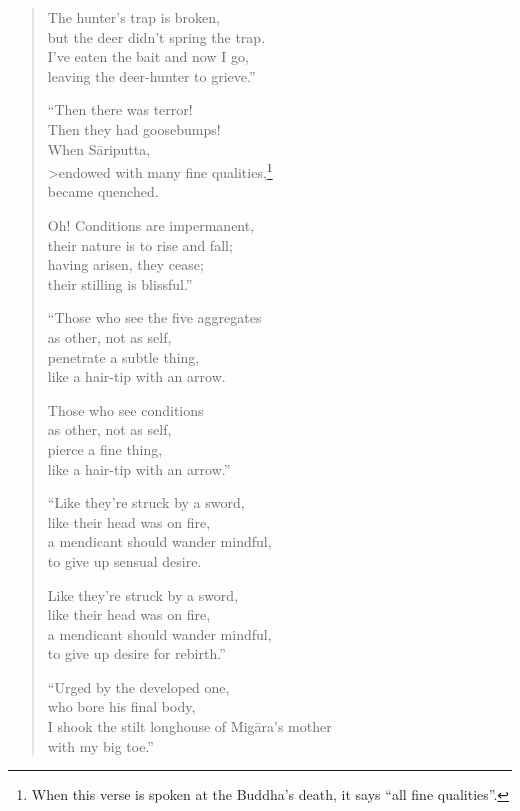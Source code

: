 \documentclass[12pt,openany]{book}%
\begin{document}
\begin{verse}
The hunter’s trap is broken, \\
but the deer didn’t spring the trap. \\
I’ve eaten the bait and now I go, \\
leaving the deer-hunter to grieve.” 

“Then there was terror! \\
Then they had goosebumps! \\
When \textsanskrit{Sāriputta}, \\>endowed with many fine qualities,\footnote{When this verse is spoken at the Buddha’s death, it says “all fine qualities”. } \\
became quenched. 

Oh! Conditions are impermanent, \\
their nature is to rise and fall; \\
having arisen, they cease; \\
their stilling is blissful.” 

“Those who see the five aggregates \\
as other, not as self, \\
penetrate a subtle thing, \\
like a hair-tip with an arrow. 

Those who see conditions \\
as other, not as self, \\
pierce a fine thing, \\
like a hair-tip with an arrow.” 

“Like they’re struck by a sword, \\
like their head was on fire, \\
a mendicant should wander mindful, \\
to give up sensual desire. 

Like they’re struck by a sword, \\
like their head was on fire, \\
a mendicant should wander mindful, \\
to give up desire for rebirth.” 

“Urged by the developed one, \\
who bore his final body, \\
I shook the stilt longhouse of \textsanskrit{Migāra}’s mother \\
with my big toe.” 


\end{verse}
\end{document}
